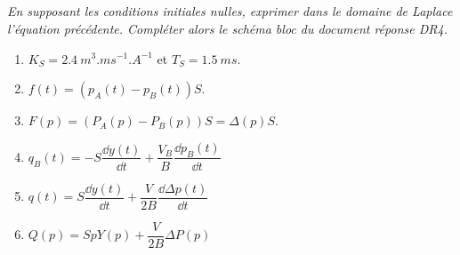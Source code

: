 \subparagraph{}
\textit{En supposant les conditions initiales nulles, exprimer dans le domaine de Laplace
l’équation précédente.
Compléter alors le schéma bloc du document réponse DR4.}
\ifprof
\begin{corrige}
\end{corrige}
\else
\fi

\begin{enumerate}
\item $K_S = \SI{2,4}{m^3.ms^{-1}.A^{-1}}$ et $T_S = \SI{1,5}{ms}$.
\item $f(t)=\left(p_A(t)-p_B(t)\right)S$.
\item $F(p)=\left(P_A(p)-P_B(p)\right)S=\Delta (p)S$.
\item $q_B(t)=-S\dfrac{\dd y(t)}{\dd t}+\dfrac{V_B}{B}\dfrac{\dd p_B(t)}{\dd t}$
\item $q(t)=S\dfrac{\dd y(t)}{\dd t}+\dfrac{V}{2B}\dfrac{\dd \Delta p(t)}{\dd t}$
\item $Q(p)=SpY(p)+\dfrac{V}{2B}\Delta P (p)$
\end{enumerate}
